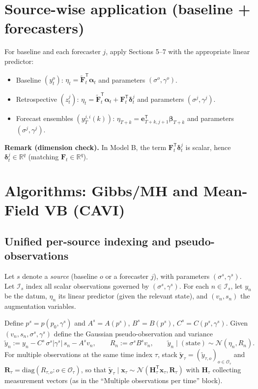 \documentclass[11pt]{article}
\newcommand{\R}{\mathbb{R}}
\newcommand{\1}{\mathbb{I}}
\newcommand{\N}{\mathcal{N}}
\newcommand{\diag}{\mathrm{diag}}
\newcommand{\T}{\mathsf{T}}
\begin{document}
\section{Source-wise application (baseline + forecasters)}

For baseline and each forecaster $j$, apply Sections 5--7 with the appropriate linear predictor:
\begin{itemize}
\item Baseline $(y_t^o)$: $\eta_t=\tilde{\bm F}_t^\T\bm\alpha_t$ and parameters $(\sigma^o,\gamma^o)$.
\item Retrospective $(z_t^j)$: $\eta_t=\tilde{\bm F}_t^\T\bm\alpha_t+\bm F_t^\T\bm\delta_t^j$ and parameters $(\sigma^j,\gamma^j)$.
\item Forecast ensembles $(y_T^{j,i}(k))$: $\eta_{T+k}=\bm e_{T+k,j+1}^\T\bm\beta_{T+k}$ and parameters $(\sigma^j,\gamma^j)$.
\end{itemize}

\bigskip
\noindent\textbf{Remark (dimension check).}
In Model B, the term $\bm F_t^\T\bm\delta_t^j$ is scalar, hence $\bm\delta_t^j\in\R^q$ (matching $\bm F_t\in\R^q$).

\section{Algorithms: Gibbs/MH and Mean-Field VB (CAVI)}

\subsection{Unified per-source indexing and pseudo-observations}

Let $s$ denote a \emph{source} (baseline $o$ or a forecaster $j$), with parameters $(\sigma^s,\gamma^s)$.
Let $\mathcal{I}_s$ index all scalar observations governed by $(\sigma^s,\gamma^s)$.
For each $n\in\mathcal{I}_s$, let $y_n$ be the datum, $\eta_n$ its linear predictor (given the relevant state),
and $(v_n,s_n)$ the augmentation variables.

Define $p^s=p(p_0,\gamma^s)$ and $A^s=A(p^s)$, $B^s=B(p^s)$, $C^s=C(p^s,\gamma^s)$.
Given $(v_n,s_n,\sigma^s,\gamma^s)$ define the Gaussian pseudo-observation and variance
\begin{equation}
\tilde y_n := y_n - C^s\,\sigma^s|\gamma^s|\,s_n - A^s v_n,
\qquad
R_n := \sigma^s B^s v_n,
\qquad
\tilde y_n \mid (\text{state}) \sim \N(\eta_n, R_n).
\label{eq:pseudo_obs_alg}
\end{equation}
For multiple observations at the same time index $\tau$, stack
$\tilde{\bm y}_\tau = (\tilde y_{\tau,o})_{o\in\mathcal{O}_\tau}$ and
$\bm R_\tau=\diag(R_{\tau,o}:o\in\mathcal{O}_\tau)$, so that
$\tilde{\bm y}_\tau\mid \bm x_\tau \sim \N(\bm H_\tau^\T \bm x_\tau,\bm R_\tau)$
with $\bm H_\tau$ collecting measurement vectors (as in the ``Multiple observations per time'' block).
\end{document}
